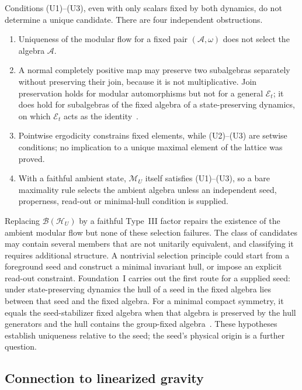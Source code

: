 \begin{remark}
\label{thm:uniqueness}
Conditions (U1)--(U3), even with only scalars fixed by both dynamics, do not determine a unique candidate. There are four independent obstructions.
\begin{enumerate}
\item Uniqueness of the modular flow for a fixed pair $(\mathcal A,\omega)$ does not select the algebra $\mathcal A$.
\item A normal completely positive map may preserve two subalgebras separately without preserving their join, because it is not multiplicative. Join preservation holds for modular automorphisms but not for a general $\mathcal E_t$; it does hold for subalgebras of the fixed algebra of a state-preserving dynamics, on which $\mathcal E_t$ acts as the identity~\cite{FoundationI}.
\item Pointwise ergodicity constrains fixed elements, while (U2)--(U3) are setwise conditions; no implication to a unique maximal element of the lattice was proved.
\item With a faithful ambient state, $\mathcal M_U$ itself satisfies (U1)--(U3), so a bare maximality rule selects the ambient algebra unless an independent seed, properness, read-out or minimal-hull condition is supplied.
\end{enumerate}
Replacing $\mathcal B(\mathcal H_U)$ by a faithful Type~III factor repairs the existence of the ambient modular flow but none of these selection failures. The class of candidates may contain several members that are not unitarily equivalent, and classifying it requires additional structure. A nontrivial selection principle could start from a foreground seed and construct a minimal invariant hull, or impose an explicit read-out constraint. Foundation~I carries out the first route for a supplied seed: under state-preserving dynamics the hull of a seed in the fixed algebra lies between that seed and the fixed algebra. For a minimal compact symmetry, it equals the seed-stabilizer fixed algebra when that algebra is preserved by the hull generators and the hull contains the group-fixed algebra~\cite{FoundationI}. These hypotheses establish uniqueness relative to the seed; the seed's physical origin is a further question.
\end{remark}

\subsection{Connection to linearized gravity}
\label{sec:linearized}


